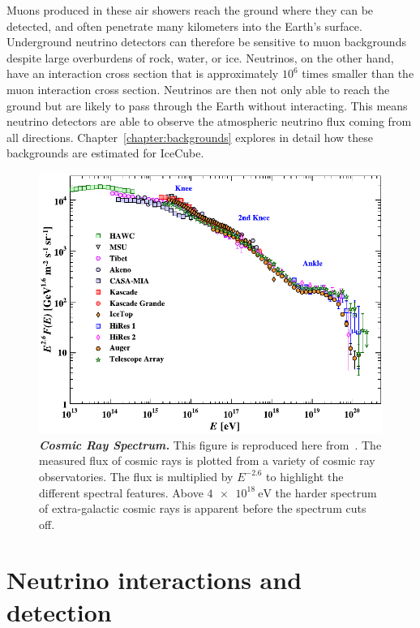 Muons produced in these air showers reach the ground where they can be detected, and often penetrate many kilometers into the Earth's surface.
Underground neutrino detectors can therefore be sensitive to muon backgrounds despite large overburdens of rock, water, or ice.
Neutrinos, on the other hand, have an interaction cross section that is approximately $10^6$ times smaller than the muon interaction cross section.
Neutrinos are then not only able to reach the ground but are likely to pass through the Earth without interacting.
This means neutrino detectors are able to observe the atmospheric neutrino flux coming from all directions.
Chapter~\ref{chapter:backgrounds} explores in detail how these backgrounds are estimated for IceCube.

\begin{figure}
	\centering
	\includegraphics[width=0.8\linewidth]{figures/cosmic_ray_spectrum}
	\internallinenumbers
	\caption{\textbf{\textit{Cosmic Ray Spectrum.}}
		This figure is reproduced here from~\cite{PhysRevD.98.030001}.
		The measured flux of cosmic rays is plotted from a variety of cosmic ray observatories.
		The flux is multiplied by $E^{-2.6}$ to highlight the different spectral features.
		Above $\SI{4e18}\eV$ the harder spectrum of extra-galactic cosmic rays is apparent before the spectrum cuts off.
	}\label{fig:cosmic_ray_spectrum}
\end{figure}

\section{Neutrino interactions and detection}

